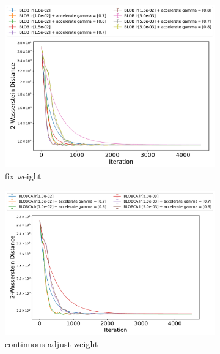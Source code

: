\begin{figure}
    \centering
    \begin{subfigure}[b]{0.35\textwidth}
        \includegraphics[width=\textwidth]{experiment_figure/GMM/demo_w2_Blob_acce_sg.pdf}
        \caption{fix weight}
        \label{fig1:image1}
    \end{subfigure}
    \hfill
    \begin{subfigure}[b]{0.35\textwidth}
        \includegraphics[width=\textwidth]{experiment_figure/GMM/demo_w2_BlobCA_acce_sg.pdf}
        \caption{continuous adjust weight}
        \label{fig1:image2}
    \end{subfigure}
    \hfill
    \begin{subfigure}[b]{0.35\textwidth}

\end{subfigure}
\end{figure}
